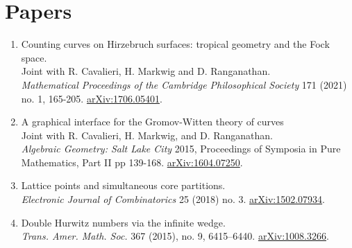 \documentclass[11pt,letterpaper]{article}
\begin{document}
\section*{Papers }
\begin{enumerate}

\item Counting curves on Hirzebruch surfaces: tropical geometry and the Fock space. \\
Joint with R. Cavalieri, H. Markwig and D. Ranganathan. \\
\emph{Mathematical Proceedings of the Cambridge Philosophical Society} 171 (2021) no. 1, 165-205.
   \href{https://arxiv.org/abs/1706.05401}{arXiv:1706.05401}.

\item A graphical interface for the Gromov-Witten theory of curves \\
Joint with R. Cavalieri, H. Markwig, and D. Ranganathan. \\
\emph{Algebraic Geometry: Salt Lake City} 2015, Proceedings of Symposia in Pure Mathematics, Part II pp 139-168. \href{https://arxiv.org/abs/1604.07250}{arXiv:1604.07250}.


\item Lattice points and simultaneous core partitions. \\
\emph{Electronic Journal of Combinatorics} 25 (2018) no. 3. 
  \href{http://arxiv.org/abs/1502.07934}{arXiv:1502.07934}.

\item Double Hurwitz numbers via the infinite wedge. \\
\emph{Trans. Amer. Math. Soc.} 367 (2015), no. 9, 6415--6440. \href{http://arxiv.org/abs/1008.3266}{arXiv:1008.3266}.


\end{enumerate}
\end{document}
